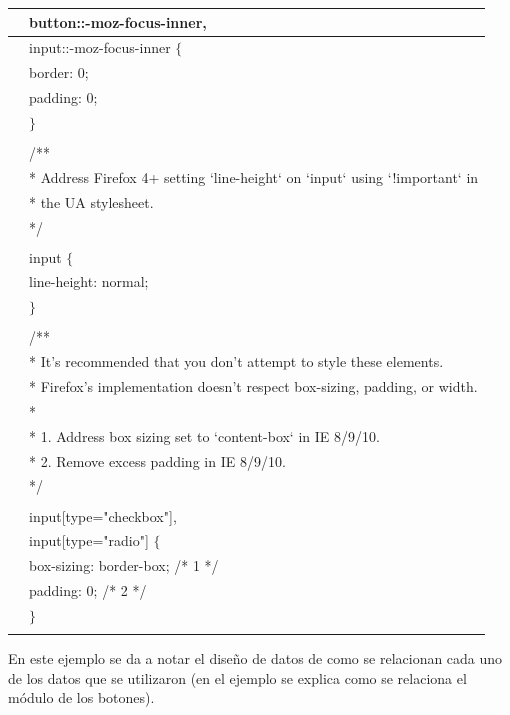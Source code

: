 \documentclass{article} %
\begin{document}
\begin{tabular}{|p{0.4in}|p{3.7in}|}
 & button::-moz-focus-inner, \\ \hline 
 & input::-moz-focus-inner $\mathrm{\{}$ \\ \hline 
 &   border: 0; \\ \hline 
 &   padding: 0; \\ \hline 
 & $\mathrm{\}}$ \\ \hline 
 & \newline  \\ \hline 
 & /** \\ \hline 
 &  * Address Firefox 4+ setting `line-height` on `input` using `!important` in \\ \hline 
 &  * the UA stylesheet. \\ \hline 
 &  */ \\ \hline 
 & \newline  \\ \hline 
 & input $\mathrm{\{}$ \\ \hline 
 &   line-height: normal; \\ \hline 
 & $\mathrm{\}}$ \\ \hline 
 & \newline  \\ \hline 
 & /** \\ \hline 
 &  * It's recommended that you don't attempt to style these elements. \\ \hline 
 &  * Firefox's implementation doesn't respect box-sizing, padding, or width. \\ \hline 
 &  * \\ \hline 
 &  * 1. Address box sizing set to `content-box` in IE 8/9/10. \\ \hline 
 &  * 2. Remove excess padding in IE 8/9/10. \\ \hline 
 &  */ \\ \hline 
 & \newline  \\ \hline 
 & input[type="checkbox"], \\ \hline 
 & input[type="radio"] $\mathrm{\{}$ \\ \hline 
 &   box-sizing: border-box; /* 1 */ \\ \hline 
 &   padding: 0; /* 2 */ \\ \hline 
 & $\mathrm{\}}$ \\ \hline 
 &  \\ \hline 
\end{tabular}



En este ejemplo se da a notar el dise\~{n}o de datos de como se relacionan cada uno de los datos que se utilizaron (en el ejemplo se explica como se relaciona el m\'{o}dulo de los botones).
\end{document}
